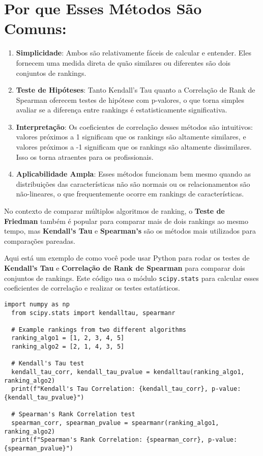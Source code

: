 \documentclass{article}
\begin{document}
\section*{Por que Esses Métodos São Comuns:}
\begin{enumerate}
    \item \textbf{Simplicidade}: Ambos são relativamente fáceis de calcular e entender. Eles fornecem uma medida direta de quão similares ou diferentes são dois conjuntos de rankings.
    \item \textbf{Teste de Hipóteses}: Tanto Kendall’s Tau quanto a Correlação de Rank de Spearman oferecem testes de hipótese com p-valores, o que torna simples avaliar se a diferença entre rankings é estatisticamente significativa.
    \item \textbf{Interpretação}: Os coeficientes de correlação desses métodos são intuitivos: valores próximos a 1 significam que os rankings são altamente similares, e valores próximos a -1 significam que os rankings são altamente dissimilares. Isso os torna atraentes para os profissionais.
    \item \textbf{Aplicabilidade Ampla}: Esses métodos funcionam bem mesmo quando as distribuições das características não são normais ou os relacionamentos são não-lineares, o que frequentemente ocorre em rankings de características.
\end{enumerate}

No contexto de comparar múltiplos algoritmos de ranking, o \textbf{Teste de Friedman} também é popular para comparar mais de dois rankings ao mesmo tempo, mas \textbf{Kendall’s Tau} e \textbf{Spearman’s} são os métodos mais utilizados para comparações pareadas.

Aqui está um exemplo de como você pode usar Python para rodar os testes de \textbf{Kendall's Tau} e \textbf{Correlação de Rank de Spearman} para comparar dois conjuntos de rankings. Este código usa o módulo \texttt{scipy.stats} para calcular esses coeficientes de correlação e realizar os testes estatísticos.

\begin{lstlisting}[style=pythonstyle, caption={Python code for Kendall's Tau and Spearman's Rank Correlation}]
  import numpy as np
  from scipy.stats import kendalltau, spearmanr
  
  # Example rankings from two different algorithms
  ranking_algo1 = [1, 2, 3, 4, 5]
  ranking_algo2 = [2, 1, 4, 3, 5]
  
  # Kendall's Tau test
  kendall_tau_corr, kendall_tau_pvalue = kendalltau(ranking_algo1, ranking_algo2)
  print(f"Kendall's Tau Correlation: {kendall_tau_corr}, p-value: {kendall_tau_pvalue}")
  
  # Spearman's Rank Correlation test
  spearman_corr, spearman_pvalue = spearmanr(ranking_algo1, ranking_algo2)
  print(f"Spearman's Rank Correlation: {spearman_corr}, p-value: {spearman_pvalue}")
\end{lstlisting}
    
\end{document}
